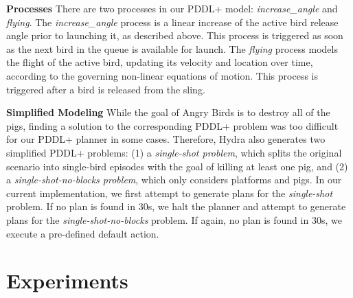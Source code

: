 \documentclass[letterpaper]{article}
\begin{document}
\noindent\textbf{Processes}
There are two processes in our PDDL+ model: \textit{increase\_angle} and \textit{flying}.  The \textit{increase\_angle} process is a linear increase of the active bird release angle prior to launching it, as described above. This process is triggered as soon as the next bird in the queue is available for launch. %
The \textit{flying} process models the flight of the active bird, updating its velocity and location over time, according to the governing non-linear equations of motion. This process is triggered after a bird is released from the sling. %





\noindent\textbf{Simplified Modeling} While the goal of Angry Birds is to destroy all of the pigs, finding a solution to the corresponding PDDL+ problem was too difficult for our PDDL+ planner in some cases.
Therefore, Hydra also generates two simplified PDDL+ problems:
(1) a \textit{single-shot problem}, which splits the original scenario into single-bird episodes with the goal of killing at least one pig, and (2) a \textit{single-shot-no-blocks problem}, which only considers platforms and pigs. In our current implementation, we first attempt to generate plans for the \textit{single-shot} problem.
If no plan is found in 30s, we halt the planner and attempt to generate plans for the \textit{single-shot-no-blocks} problem.
If again, no plan is found in 30s, we execute a pre-defined default action.
































\vspace{-0.94mm}
\section{Experiments}
\end{document}
